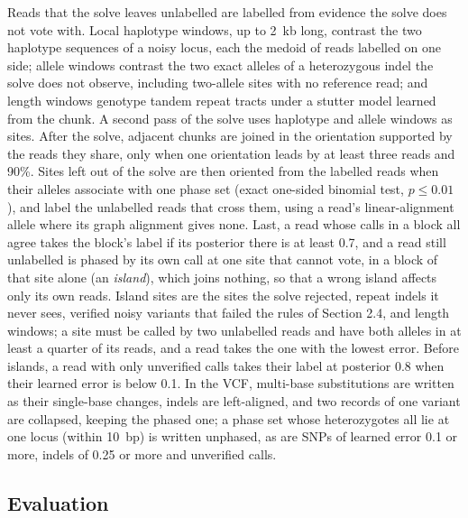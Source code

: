 Reads that the solve leaves unlabelled are labelled from evidence the solve does not vote with. Local haplotype windows, up to 2~kb long, contrast the two haplotype sequences of a noisy locus, each the medoid of reads labelled on one side; allele windows contrast the two exact alleles of a heterozygous indel the solve does not observe, including two-allele sites with no reference read; and length windows genotype tandem repeat tracts under a stutter model learned from the chunk. A second pass of the solve uses haplotype and allele windows as sites. After the solve, adjacent chunks are joined in the orientation supported by the reads they share, only when one orientation leads by at least three reads and 90\%. Sites left out of the solve are then oriented from the labelled reads when their alleles associate with one phase set (exact one-sided binomial test, \(p \le 0.01\)), and label the unlabelled reads that cross them, using a read's linear-alignment allele where its graph alignment gives none. Last, a read whose calls in a block all agree takes the block's label if its posterior there is at least 0.7, and a read still unlabelled is phased by its own call at one site that cannot vote, in a block of that site alone (an \emph{island}), which joins nothing, so that a wrong island affects only its own reads. Island sites are the sites the solve rejected, repeat indels it never sees, verified noisy variants that failed the rules of Section 2.4, and length windows; a site must be called by two unlabelled reads and have both alleles in at least a quarter of its reads, and a read takes the one with the lowest error. Before islands, a read with only unverified calls takes their label at posterior 0.8 when their learned error is below 0.1. In the VCF, multi-base substitutions are written as their single-base changes, indels are left-aligned, and two records of one variant are collapsed, keeping the phased one; a phase set whose heterozygotes all lie at one locus (within 10~bp) is written unphased, as are SNPs of learned error 0.1 or more, indels of 0.25 or more and unverified calls.

\subsection{Evaluation}

